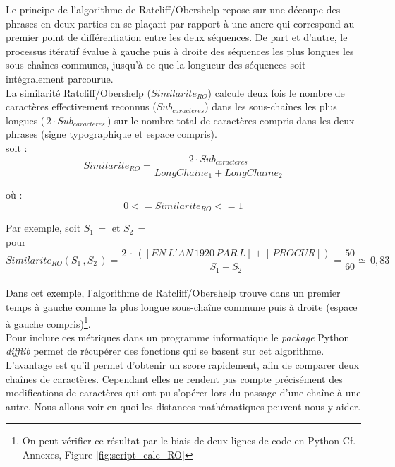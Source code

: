 Le principe de l'algorithme de Ratcliff/Obershelp repose sur une découpe des phrases en deux parties en se plaçant par rapport à une ancre qui correspond au premier point de différentiation entre les deux séquences. De part et d'autre, le processus itératif évalue à gauche puis à droite des séquences les plus longues les sous-chaînes communes, jusqu'à ce que la longueur des séquences soit intégralement parcourue.\\
\newpage
La similarité Ratcliff/Obershelp ($ Similarite_{RO} $) calcule deux fois le nombre de caractères effectivement reconnus ($Sub_{caracteres}$) dans les sous-chaînes les plus longues ($\, 2 \cdot Sub_{caracteres} \,$) sur le nombre total de caractères compris dans les deux phrases (signe typographique et espace compris).\\

soit : $$ Similarite_{RO} = \frac{2 \cdot Sub_{caracteres}}{LongChaine_1+LongChaine_2} $$

où : $$ 0 <= Similarite_{RO} <= 1 $$

Par exemple, soit $ S_1 \,= $  et $ S_2 \,=$ \\

pour $$Similarite_{RO}(S_1 \,, S_2 \,) = \frac{2 \, \cdot \, ([EN\, L'AN\, 1920\, PAR\, L] + [\, PROCUR])}{S_1+S_2} = \frac{50}{60} \simeq  \, 0,83$$\\ 

Dans cet exemple, l'algorithme de Ratcliff/Obershelp trouve dans un premier temps  à gauche comme la plus longue sous-chaîne commune puis à droite  (espace à gauche compris)\footnote{On peut vérifier ce résultat par le biais de deux lignes de code en Python Cf. Annexes, Figure \ref{fig:script_calc_RO}}.\\

Pour inclure ces métriques dans un programme informatique le \textit{package} Python \textit{difflib} permet de récupérer des fonctions qui se basent sur cet algorithme.\\

L'avantage est qu'il permet d'obtenir un score rapidement, afin de comparer deux chaînes de caractères. Cependant elles ne rendent pas compte précisément des modifications de caractères qui ont pu s'opérer lors du passage d'une chaîne à une autre. Nous allons voir en quoi les distances mathématiques peuvent nous y aider.\\

